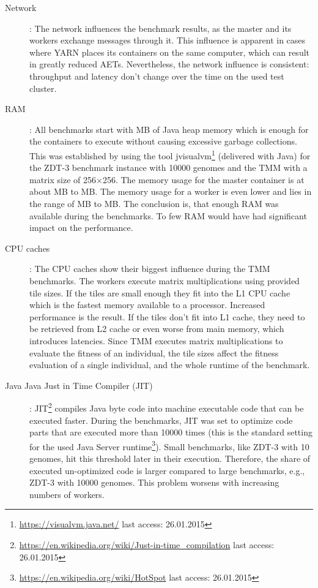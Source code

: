 \begin{description}
  \item [Network]: The network influences the benchmark results, as the master and its workers exchange messages through it. This influence is apparent in cases where YARN places its containers on the same computer, which can result in greatly reduced AETs. Nevertheless, the network influence is consistent: throughput and latency don't change over the time on the used test cluster.
  \item [RAM]: All benchmarks start with \unit[256]{MB} of Java heap memory which is enough for the containers to execute without causing excessive garbage collections. This was established by using the tool jvisualvm\footnote{\url{https://visualvm.java.net/} last access: 26.01.2015} (delivered with Java) for the ZDT-3 benchmark instance with 10000 genomes and the TMM with a matrix size of 256$\times$256. The memory usage for the master container is at about \unit[100]{MB} to \unit[150]{MB}. The memory usage for a worker is even lower and lies in the range of \unit[5]{MB} to \unit[30]{MB}. The conclusion is, that enough RAM was available during the benchmarks. To few RAM would have had significant impact on the performance.
  \item [CPU caches]: The CPU caches show their biggest influence during the TMM benchmarks. The workers execute matrix multiplications using provided tile sizes. If the tiles are small enough they fit into the L1 CPU cache which is the fastest memory available to a processor. Increased performance is the result. If the tiles don't fit into L1 cache, they need to be retrieved from L2 cache or even worse from main memory, which introduces latencies. Since TMM executes matrix multiplications to evaluate the fitness of an individual, the tile sizes affect the fitness evaluation of a single individual, and the whole runtime of the benchmark.
  \item [Java Java Just in Time Compiler (JIT)]: JIT\footnote{\url{https://en.wikipedia.org/wiki/Just-in-time_compilation} last access: 26.01.2015} compiles Java byte code into machine executable code that can be executed faster. During the benchmarks, JIT was set to optimize code parts that are executed more than 10000 times (this is the standard setting for the used Java Server runtime\footnote{\url{https://en.wikipedia.org/wiki/HotSpot} last access: 26.01.2015}). Small benchmarks, like ZDT-3 with 10 genomes, hit this threshold later in their execution. Therefore, the share of executed un-optimized code is larger compared to large benchmarks, e.g., ZDT-3 with 10000 genomes. This problem worsens with increasing numbers of workers.

\end{description}
